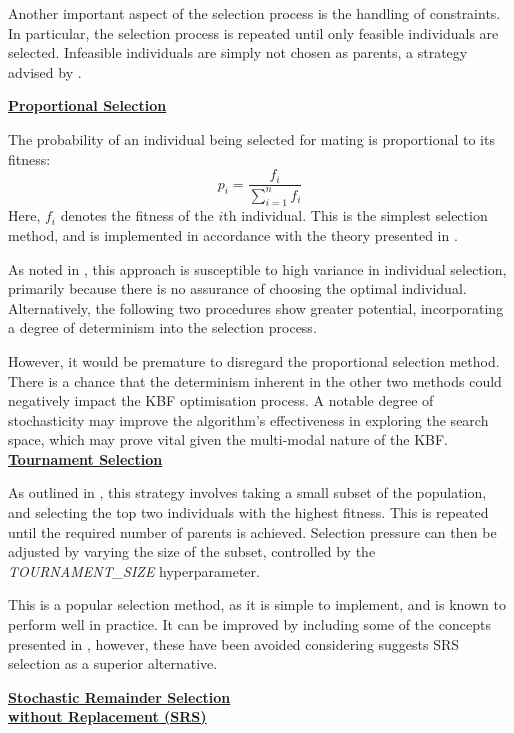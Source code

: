 \documentclass[10pt]{article}
\begin{document}
\begin{multicols}{2}
Another important aspect of the selection process is the handling of constraints. In particular, the selection process is repeated until only feasible individuals are selected. Infeasible individuals are simply not chosen as parents, a strategy advised by \cite{parks2023geneticalgorithms}. 

\textbf{\underline{Proportional Selection}}

The probability of an individual being selected for mating is proportional to its fitness:
\[
    p_i = \frac{f_i}{\sum_{i=1}^{n} f_i}
\]
Here, \(f_i\) denotes the fitness of the \(i\)th individual. This is the simplest selection method, and is implemented in accordance with the theory presented in \cite{parks2023geneticalgorithms}.

As noted in \cite{parks2023geneticalgorithms}, this approach is susceptible to high variance in individual selection, primarily because there is no assurance of choosing the optimal individual. Alternatively, the following two procedures show greater potential, incorporating a degree of determinism into the selection process.

However, it would be premature to disregard the proportional selection method. There is a chance that the determinism inherent in the other two methods could negatively impact the KBF optimisation process. A notable degree of stochasticity may improve the algorithm's effectiveness in exploring the search space, which may prove vital given the multi-modal nature of the KBF.
\textbf{\underline{Tournament Selection}}

As outlined in \cite{parks2023geneticalgorithms}, this strategy involves taking a small subset of the population, and selecting the top two individuals with the highest fitness. This is repeated until the required number of parents is achieved. Selection pressure can then be adjusted by varying the size of the subset, controlled by the \textit{TOURNAMENT\_SIZE} hyperparameter.

This is a popular selection method, as it is simple to implement, and is known to perform well in practice. It can be improved by including some of the concepts presented in \cite{Miller1995GeneticAT}, however, these have been avoided considering \cite{parks2023geneticalgorithms} suggests SRS selection as a superior alternative.

\textbf{\underline{Stochastic Remainder Selection}}\\\vspace{0.5mm}
\textbf{\underline{\hspace{-0.5mm}without Replacement (SRS)}}


\end{multicols}
\end{document}
